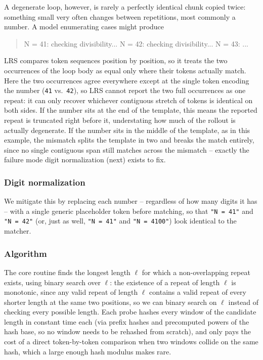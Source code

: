 \documentclass{article}
\begin{document}
A degenerate loop, however, is rarely a perfectly identical chunk copied
twice: something small very often changes between repetitions, most
commonly a number. A model enumerating cases might produce
\begin{quote}
\ttfamily\raggedright N = 41: checking divisibility... N = 42: checking divisibility... N = 43: ...
\end{quote}
LRS compares token sequences position by position, so it treats the two
occurrences of the loop body as equal only where their tokens actually
match. Here the two occurrences agree everywhere except at the single token
encoding the number (\texttt{41} vs.\ \texttt{42}), so LRS cannot report the
two full occurrences as one repeat: it can only recover whichever
contiguous stretch of tokens is identical on both sides. If the number
sits at the end of the template, this means the reported repeat is
truncated right before it, understating how much of the rollout is
actually degenerate. If the number sits in the middle of the template,
as in this example, the mismatch splits the template in two and breaks the
match entirely, since no single contiguous span still matches across the
mismatch -- exactly the failure mode digit normalization (next) exists to
fix.

\subsubsection{Digit normalization}

We mitigate this by replacing each number -- regardless of how many digits
it has -- with a single generic placeholder token before matching, so that
\texttt{"N = 41"} and \texttt{"N = 42"} (or, just as well, \texttt{"N = 41"}
and \texttt{"N = 4100"}) look identical to the matcher.

\subsubsection{Algorithm}

The core routine finds the longest length $\ell$ for which a non-overlapping
repeat exists, using binary search over $\ell$: the existence of a repeat
of length $\ell$ is monotonic, since any valid repeat of length $\ell$
contains a valid repeat of every shorter length at the same two positions,
so we can binary search on $\ell$ instead of checking every possible
length. Each probe hashes every window of the candidate length in constant
time each (via prefix hashes and precomputed powers of the hash base, so no
window needs to be rehashed from scratch), and only pays the cost of a
direct token-by-token comparison when two windows collide on the same hash,
which a large enough hash modulus makes rare.
\end{document}
